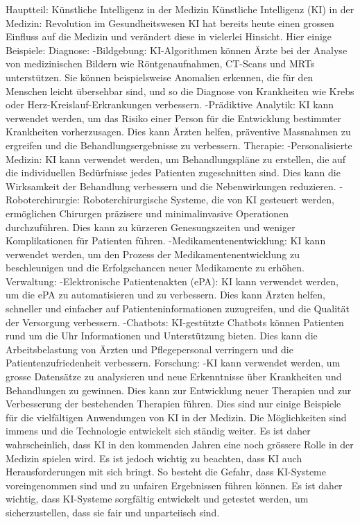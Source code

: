 \documentclass{article}
\begin{document}
{    
    Hauptteil:
    Künstliche Intelligenz in der Medizin
    Künstliche Intelligenz (KI) in der Medizin: Revolution im Gesundheitswesen
    KI hat bereits heute einen grossen Einfluss auf die Medizin und verändert diese in vielerlei Hinsicht. Hier einige Beispiele:
    Diagnose:
    -Bildgebung: KI-Algorithmen können Ärzte bei der Analyse von medizinischen Bildern wie Röntgenaufnahmen, CT-Scans und MRTs unterstützen. Sie können beispielsweise Anomalien erkennen, die für den Menschen leicht übersehbar sind, und so die Diagnose von Krankheiten wie Krebs oder Herz-Kreislauf-Erkrankungen verbessern.
    -Prädiktive Analytik: KI kann verwendet werden, um das Risiko einer Person für die Entwicklung bestimmter Krankheiten vorherzusagen. Dies kann Ärzten helfen, präventive Massnahmen zu ergreifen und die Behandlungsergebnisse zu verbessern.
    Therapie:
    -Personalisierte Medizin: KI kann verwendet werden, um Behandlungspläne zu erstellen, die auf die individuellen Bedürfnisse jedes Patienten zugeschnitten sind. Dies kann die Wirksamkeit der Behandlung verbessern und die Nebenwirkungen reduzieren.
    -Roboterchirurgie: Roboterchirurgische Systeme, die von KI gesteuert werden, ermöglichen Chirurgen präzisere und minimalinvasive Operationen durchzuführen. Dies kann zu kürzeren Genesungszeiten und weniger Komplikationen für Patienten führen.
    -Medikamentenentwicklung: KI kann verwendet werden, um den Prozess der Medikamentenentwicklung zu beschleunigen und die Erfolgschancen neuer Medikamente zu erhöhen.
    Verwaltung:
    -Elektronische Patientenakten (ePA): KI kann verwendet werden, um die ePA zu automatisieren und zu verbessern. Dies kann Ärzten helfen, schneller und einfacher auf Patienteninformationen zuzugreifen, und die Qualität der Versorgung verbessern.
    -Chatbots: KI-gestützte Chatbots können Patienten rund um die Uhr Informationen und Unterstützung bieten. Dies kann die Arbeitsbelastung von Ärzten und Pflegepersonal verringern und die Patientenzufriedenheit verbessern.
    Forschung:
    -KI kann verwendet werden, um grosse Datensätze zu analysieren und neue Erkenntnisse über Krankheiten und Behandlungen zu gewinnen. Dies kann zur Entwicklung neuer Therapien und zur Verbesserung der bestehenden Therapien führen.
    Dies sind nur einige Beispiele für die vielfältigen Anwendungen von KI in der Medizin. Die Möglichkeiten sind immens und die Technologie entwickelt sich ständig weiter. Es ist daher wahrscheinlich, dass KI in den kommenden Jahren eine noch grössere Rolle in der Medizin spielen wird.
    Es ist jedoch wichtig zu beachten, dass KI auch Herausforderungen mit sich bringt. So besteht die Gefahr, dass KI-Systeme voreingenommen sind und zu unfairen Ergebnissen führen können. Es ist daher wichtig, dass KI-Systeme sorgfältig entwickelt und getestet werden, um sicherzustellen, dass sie fair und unparteiisch sind.
}
\end{document}
